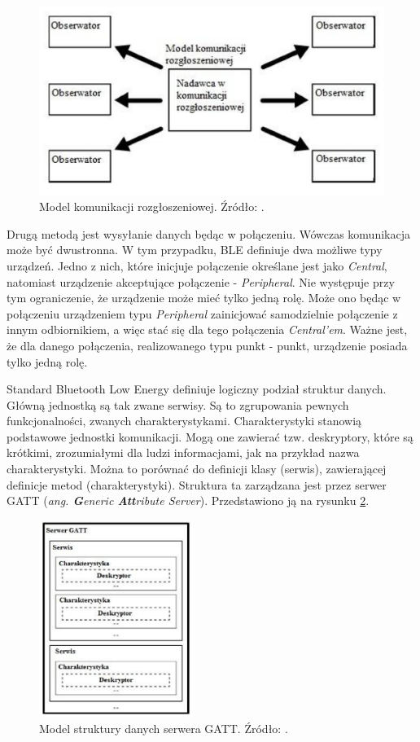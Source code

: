 \begin{figure}[H]
	\centering
	\includegraphics[width=12cm]{img/theory/BLE/ble_advertising.png}
	\caption{Model komunikacji rozgłoszeniowej. Źródło: \cite{inzynierka}.}
	\label{fig:image_ble_advertising}
\end{figure}

Drugą metodą jest wysyłanie danych będąc w połączeniu. Wówczas komunikacja może być dwustronna. W tym przypadku, BLE definiuje dwa możliwe typy urządzeń. Jedno z nich, które inicjuje połączenie określane jest jako \textit{Central}, natomiast urządzenie akceptujące połączenie - \textit{Peripheral}. Nie występuje przy tym ograniczenie, że urządzenie może mieć tylko jedną rolę. Może ono będąc w połączeniu urządzeniem typu \textit{Peripheral} zainicjować samodzielnie połączenie z innym odbiornikiem, a więc stać się dla tego połączenia \textit{Central'em}. Ważne jest, że dla danego połączenia, realizowanego typu punkt - punkt, urządzenie posiada tylko jedną rolę. 

Standard Bluetooth Low Energy definiuje logiczny podział struktur danych. Główną jednostką są tak zwane serwisy. Są to zgrupowania pewnych funkcjonalności, zwanych charakterystykami. Charakterystyki stanowią podstawowe jednostki komunikacji. Mogą one zawierać tzw. deskryptory, które są krótkimi, zrozumiałymi dla ludzi informacjami, jak na przykład nazwa charakterystyki. Można to porównać do definicji klasy (serwis), zawierającej definicje metod (charakterystyki). Struktura ta zarządzana jest przez serwer GATT (\textit{ang. \textbf{G}eneric \textbf{Att}ribute Server}). Przedstawiono ją na rysunku \ref{fig:image_ble_services}. 

\begin{figure}[H]
	\centering
	\includegraphics[width=5cm]{img/theory/BLE/ble_services.png}
	\caption{Model struktury danych serwera GATT. Źródło: \cite{inzynierka}.}
	\label{fig:image_ble_services}
\end{figure}

